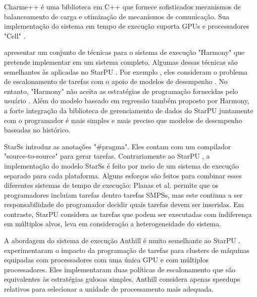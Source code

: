 Charme++\citep{kunzman2006charm++} é uma biblioteca em C++ que fornece sofisticados mecanismos de balanceamento de carga e otimização de mecanismos de comunicação. Sua implementação do sistema em tempo de execução suporta GPUs e processadores "Cell" . 

\citep{harmony} apresentar um conjunto de técnicas para o sistema de execução "Harmony" que pretende implementar em um sistema completo. Algumas dessas técnicas são semelhantes às aplicadas no StarPU . Por exemplo , eles consideram o problema de escalonamento de tarefas com o apoio de modelos de desempenho . No entanto, "Harmony" não aceita as estratégias de programação fornecidas pelo usuário . Além do modelo baseado em regressão também proposto por Harmony, a forte integração da biblioteca de gerenciamento de dados do StarPU juntamente com o programador é mais simples e mais preciso que modelos de desempenho baseadas no histórico. 

StarSs \citep{StarSs} introduz  as anotações "\#pragma". Eles contam com um compilador "source-to-source" para gerar tarefas. Contrariamente ao StarPU , a implementação do modelo StarSs é feito por meio de um sistema de execução separado para cada plataforma. Alguns esforços são feitos para combinar esses diferentes sistemas de tempo de execução: Planas et al. permite que os programadores incluíam tarefas dentro tarefas SMPSs, mas este continua a ser responsabilidade do programador decidir quais tarefas devem ser inseridas. Em contraste, StarPU considera as tarefas que podem ser executadas com indiferença em múltiplos alvos, leva em consideração a heterogeneidade do sistema.

A abordagem do sistema de execução Anthill é muito semelhante ao StarPU . \citep{Anthill} experimentaram o impacto da programação de tarefas para clusters de máquinas equipadas com processadores com uma única GPU e com múltiplos processadores. Eles implementaram duas políticas de escalonamento que são equivalentes às estratégias gulosas simples. Anthill considera apenas speedups relativos para selecionar a unidade de processamento mais adequada.






